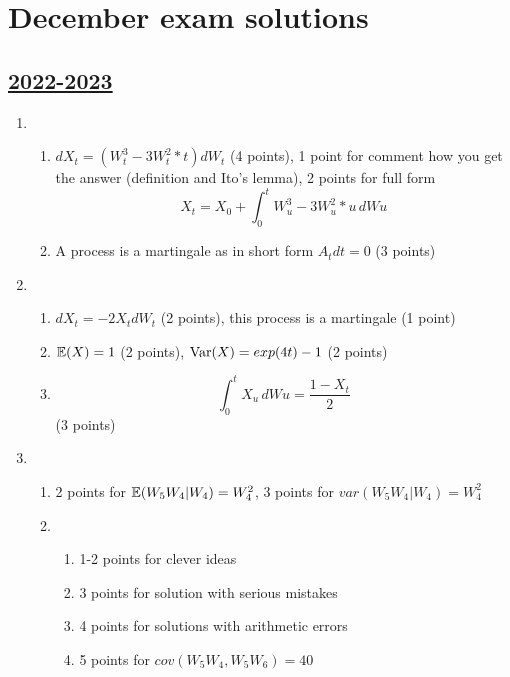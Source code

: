 
\newpage
\thispagestyle{empty}
\section{December exam solutions}
\subsection[2022-2023]{\hyperref[sec:kr_02_2022_2023]{2022-2023}}
\label{sec:sol_kr_02_2022_2023} %

\begin{enumerate}
\item 
\begin{enumerate}
    \item $dX_t = (W^3_t-3W^2_t*t)dW_t$ (4 points), 1 point for comment how you get the answer (definition and Ito's lemma), 2 points for full form 
    \[ X_t = X_0 + \int_{0}^{t} W^3_u-3W^2_u*u \,dWu
    \]
    \item A process is a martingale as in short form $A_t dt =0$ (3 points)
\end{enumerate}

\item 
\begin{enumerate}
    \item $dX_t=-2X_t dW_t$ (2 points), this process is a martingale (1 point)
    \item $\operatorname{\mathbb{E}}(X)=1$ (2 points), $\operatorname{Var}(X)=exp(4t)-1$ (2 points)
    \item \[ \int_{0}^{t} X_u\,dWu = \frac{1-X_t}{2}\] (3 points)
\end{enumerate}

\item \begin{enumerate}
    \item 2 points for $\operatorname{\mathbb{E}}(W_5 W_4 | W_4) = W_4^2$, 3 points for $var(W_5 W_4 | W_4) = W_4^2$
    \item \begin{enumerate}
        \item 1-2 points for clever ideas
        \item 3 points for solution with serious mistakes
        \item 4 points for solutions with arithmetic errors
        \item 5 points for $cov(W_5 W_4, W_5 W_6) = 40$
    \end{enumerate}
\end{enumerate}


\end{enumerate}
